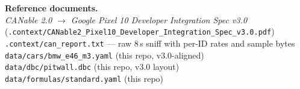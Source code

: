 \documentclass[11pt,a4paper]{article}
\begin{document}
\vspace{1em}

\noindent\textbf{Reference documents.}\\
\hspace*{1em}\textit{CANable 2.0 $\to$ Google Pixel 10 Developer Integration Spec v3.0} (\texttt{.context/CANable2\_Pixel10\_Developer\_Integration\_Spec\_v3.0.pdf})\\
\hspace*{1em}\texttt{.context/can\_report.txt} --- raw 8\,s sniff with per-ID rates and sample bytes\\
\hspace*{1em}\texttt{data/cars/bmw\_e46\_m3.yaml} (this repo, v3.0-aligned)\\
\hspace*{1em}\texttt{data/dbc/pitwall.dbc} (this repo, v3.0 layout)\\
\hspace*{1em}\texttt{data/formulas/standard.yaml} (this repo)
\end{document}
